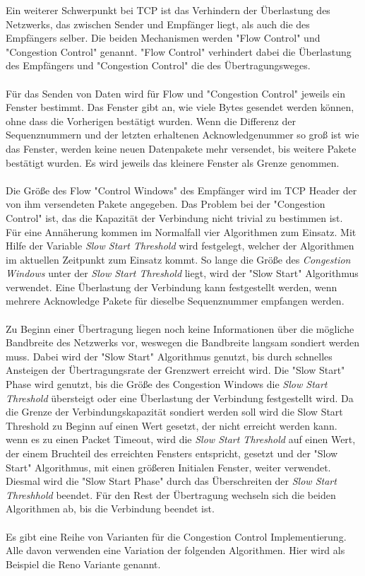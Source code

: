 Ein weiterer Schwerpunkt bei TCP ist das Verhindern der Überlastung des Netzwerks, das zwischen Sender und Empfänger liegt, als auch die des Empfängers selber. 
Die beiden Mechanismen werden "{}Flow Control"{} und "{}Congestion Control"{} genannt. 
{}"Flow Control{}" verhindert dabei die Überlastung des Empfängers und "{}Congestion Control{}" die des Übertragungsweges. \\\\
Für das Senden von Daten wird für Flow und "{}Congestion Control"{} jeweils ein Fenster bestimmt. Das Fenster gibt an, wie viele Bytes gesendet werden können, ohne dass die Vorherigen bestätigt wurden. Wenn die Differenz der Sequenznummern und der letzten erhaltenen Acknowledgenummer so groß ist wie das Fenster, werden keine neuen Datenpakete mehr versendet, bis weitere Pakete bestätigt wurden. Es wird jeweils das kleinere Fenster als Grenze genommen. \\\\
Die Größe des Flow {}"Control Windows{}" des Empfänger wird im TCP Header der von ihm versendeten Pakete angegeben. 
Das Problem bei der "{}Congestion Control"{} ist, das die Kapazität der Verbindung nicht trivial zu bestimmen ist. Für eine Annäherung kommen im Normalfall vier Algorithmen zum Einsatz. Mit Hilfe der Variable \textit{Slow Start Threshold} wird festgelegt, welcher der Algorithmen im aktuellen Zeitpunkt zum Einsatz kommt. So lange die Größe des \textit{Congestion Windows} unter der \textit{Slow Start Threshold} liegt, wird der "{}Slow Start"{} Algorithmus verwendet. Eine Überlastung der Verbindung kann festgestellt werden, wenn mehrere Acknowledge Pakete für dieselbe Sequenznummer empfangen werden.\\\\
Zu Beginn einer Übertragung liegen noch keine Informationen über die mögliche Bandbreite des Netzwerks vor, weswegen die Bandbreite langsam sondiert werden muss. Dabei wird der {}"Slow Start"{} Algorithmus genutzt, bis durch schnelles Ansteigen der Übertragungsrate der Grenzwert erreicht wird. Die {}"Slow Start"{} Phase wird genutzt, bis die Größe des Congestion Windows die \textit{Slow Start Threshold} übersteigt oder eine Überlastung der Verbindung festgestellt wird. Da die Grenze der Verbindungskapazität sondiert werden soll wird die Slow Start Threshold zu Beginn auf einen Wert gesetzt, der nicht erreicht werden kann. wenn es zu einen Packet Timeout, wird die \textit{Slow Start Threshold} auf einen Wert, der einem Bruchteil des erreichten Fensters entspricht, gesetzt und der {}"Slow Start"{} Algorithmus, mit einen größeren Initialen Fenster, weiter verwendet. Diesmal wird die {}"Slow Start Phase"{} durch das Überschreiten der \textit{Slow Start Threshhold} beendet. Für den Rest der Übertragung wechseln sich die beiden Algorithmen ab, bis die Verbindung beendet ist.\\\\
Es gibt eine Reihe von Varianten für die Congestion Control Implementierung. Alle davon verwenden eine Variation der folgenden Algorithmen. Hier wird als Beispiel die Reno Variante genannt.


